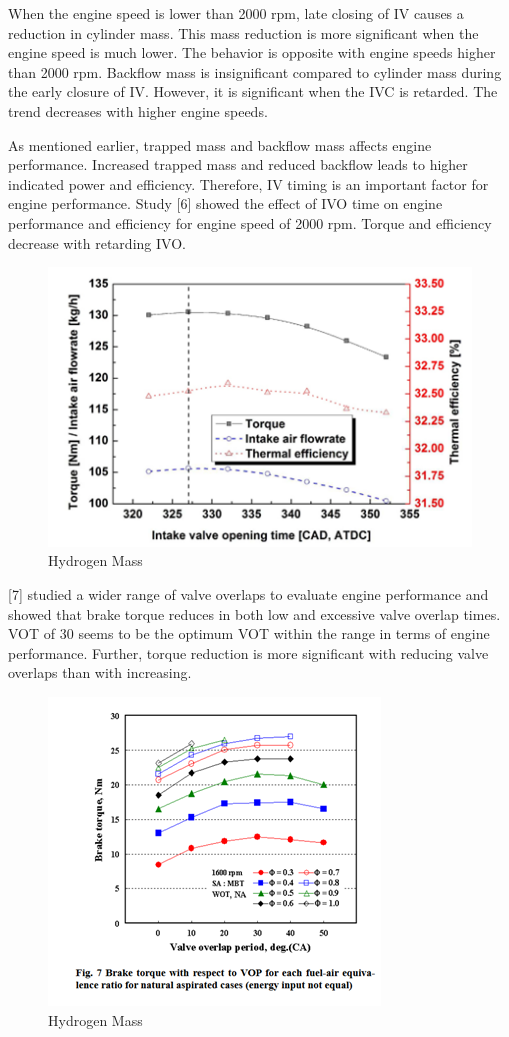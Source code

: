 \documentclass[conference]{IEEEtran}
\begin{document}
When the engine speed is lower than 2000 rpm, late closing of IV causes a reduction in cylinder mass. This mass reduction is more significant when the engine speed is much lower.
The behavior is opposite with engine speeds higher than 2000 rpm.
Backflow mass is insignificant compared to cylinder mass during the early closure of IV.
However, it is significant when the IVC is retarded. The trend decreases with higher engine speeds.

As mentioned earlier, trapped mass and backflow mass affects engine performance. Increased trapped mass and reduced backflow leads to higher indicated power and efficiency. Therefore, IV timing is an important factor for engine performance.
Study [6] showed the effect of IVO time on engine performance and efficiency for engine speed of 2000 rpm. Torque and efficiency decrease with retarding IVO.

\begin{figure}[htbp]
    \centerline{\includegraphics{figures/LR_VT_2.png}}
    \caption{Hydrogen Mass}
    \label{lr_vt_2}
    \end{figure}

[7] studied a wider range of valve overlaps to evaluate engine performance and showed that brake torque reduces in both low and excessive valve overlap times. VOT of 30 seems to be the optimum VOT within the range in terms of engine performance. Further, torque reduction is more significant with reducing valve overlaps than with increasing. 

\begin{figure}[htbp]
    \centerline{\includegraphics{figures/LR_VT_3.png}}
    \caption{Hydrogen Mass}
    \label{lr_vt_3}
    \end{figure}
\end{document}
